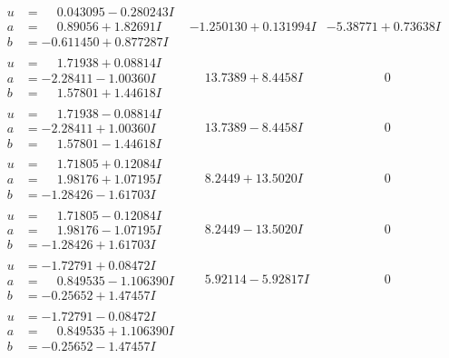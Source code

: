 \documentclass[1p]{elsarticle_modified}
\theoremstyle{definition}
\begin{document}
$$\begin{array}{c|c|c}
\begin{aligned}
u &= \phantom{-}0.043095 - 0.280243 I \\
a &= \phantom{-}0.89056 + 1.82691 I \\
b &= -0.611450 + 0.877287 I\end{aligned}
 & -1.250130 + 0.131994 I & -5.38771 + 0.73638 I \\ \hline\begin{aligned}
u &= \phantom{-}1.71938 + 0.08814 I \\
a &= -2.28411 - 1.00360 I \\
b &= \phantom{-}1.57801 + 1.44618 I\end{aligned}
 & \phantom{-}13.7389 + 8.4458 I & \phantom{-0.000000 } 0 \\ \hline\begin{aligned}
u &= \phantom{-}1.71938 - 0.08814 I \\
a &= -2.28411 + 1.00360 I \\
b &= \phantom{-}1.57801 - 1.44618 I\end{aligned}
 & \phantom{-}13.7389 - 8.4458 I & \phantom{-0.000000 } 0 \\ \hline\begin{aligned}
u &= \phantom{-}1.71805 + 0.12084 I \\
a &= \phantom{-}1.98176 + 1.07195 I \\
b &= -1.28426 - 1.61703 I\end{aligned}
 & \phantom{-}8.2449 + 13.5020 I & \phantom{-0.000000 } 0 \\ \hline\begin{aligned}
u &= \phantom{-}1.71805 - 0.12084 I \\
a &= \phantom{-}1.98176 - 1.07195 I \\
b &= -1.28426 + 1.61703 I\end{aligned}
 & \phantom{-}8.2449 - 13.5020 I & \phantom{-0.000000 } 0 \\ \hline\begin{aligned}
u &= -1.72791 + 0.08472 I \\
a &= \phantom{-}0.849535 - 1.106390 I \\
b &= -0.25652 + 1.47457 I\end{aligned}
 & \phantom{-}5.92114 - 5.92817 I & \phantom{-0.000000 } 0 \\ \hline\begin{aligned}
u &= -1.72791 - 0.08472 I \\
a &= \phantom{-}0.849535 + 1.106390 I \\
b &= -0.25652 - 1.47457 I\end{aligned}

\end{array}$$
\end{document}

